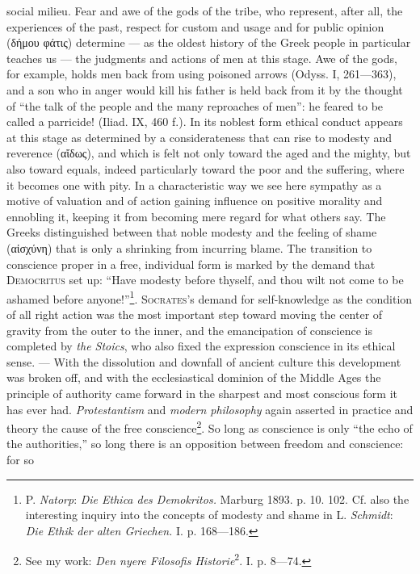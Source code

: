 \documentclass[12pt,a4paper,openany]{book}
\newcommand{\opage}[1]{\marginnote{\footnotesize\textit{[#1]}}}
\begin{document}
social milieu. Fear and awe of the gods of the tribe, who represent, after all, the experiences of the
past, respect for custom and usage and for public opinion (δήμου φάτις) determine --- as the oldest history of
the Greek people in particular teaches us --- the judgments and actions of men at this stage. Awe of the
gods, for example, holds men back from using poisoned arrows (Odyss. I, 261---363), %
 and a son who in
anger would kill his father is held back from it by the thought of ``the talk of the people and the many
reproaches of men'': he feared to be called a parricide! (Iliad. IX, 460 f.). In its noblest form
ethical conduct appears at this stage as determined by a considerateness that can rise to modesty and
reverence (αἴδως), and which is felt not only toward the aged and the mighty, but also toward equals,
indeed particularly toward the poor and the suffering, where it becomes one with pity. In a
characteristic way we see here sympathy as a motive of valuation
\opage{85}and of action gaining influence on positive morality and ennobling it, keeping it from becoming mere
regard for what others say. The Greeks distinguished between that noble modesty and the feeling of shame
(αἰσχύνη) that is only a shrinking from incurring blame. The transition to conscience proper in a free,
individual form is marked by the demand that \textsc{Democritus} set up: ``Have modesty before thyself,
and thou wilt not come to be ashamed before anyone!''\footnote[1]{P. \emph{Natorp}: \textit{Die Ethica des
Demokritos.} Marburg 1893. p. 10. 102. Cf. also the interesting inquiry into the concepts of modesty
and shame in L. \emph{Schmidt}: \textit{Die Ethik der alten Griechen.} I. p. 168---186.}.
\textsc{Socrates}'s demand for self-knowledge as the condition of all right action was the most
important step toward moving the center of gravity from the outer to the inner, and the emancipation of
conscience is completed by \textit{the Stoics}, who also fixed the expression conscience in its ethical
sense. --- With the dissolution and downfall of ancient culture this development was broken off, and
with the ecclesiastical dominion of the Middle Ages the principle of authority came forward in the
sharpest and most conscious form it has ever had. \textit{Protestantism} and \textit{modern philosophy}
again asserted in practice and theory the cause of the free conscience\footnote[2]{See my work:
\textit{Den nyere Filosofis Historie}\textsuperscript{2}. I. p. 8---74.}. So long as conscience is only
``the echo of the authorities,'' so long there is an opposition between freedom and conscience: for so
\end{document}
